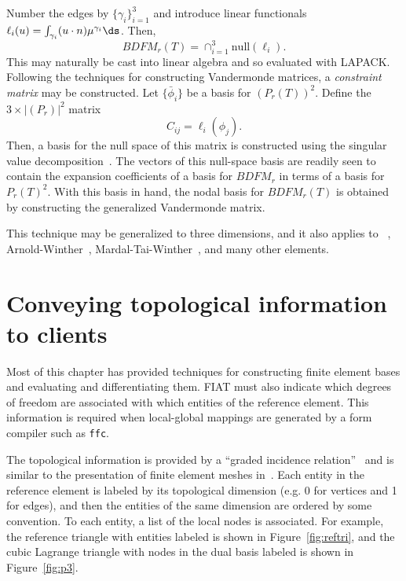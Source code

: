 Number the edges by \( \{ \gamma_i \}_{i=1}^3 \) and introduce linear
functionals \\ \( \ell_i(u) = \int_{\gamma_i} (u \cdot n) \mu^{\gamma_i}
\ds \).  Then,
\[
BDFM_r(T) = \cap_{i=1}^3 \mathrm{null}(\ell_i).
\]
This may naturally be cast into linear algebra and so evaluated with
LAPACK.  Following the techniques for constructing Vandermonde matrices,
a \emph{constraint matrix} may be constructed.  Let \( \{ \bar{\phi}_i \}
\) be a basis for \( (P_r(T))^2 \).  Define the \( 3 \times |(P_r)|^2
\) matrix
\[
C_{ij} = \ell_i( \phi_j ).
\]
Then, a basis for the null space of this matrix is constructed using
the singular value decomposition~\citep{GolubVan1996}.  The vectors of this
null-space basis are readily seen to contain the expansion coefficients
of a basis for \( BDFM_r \) in terms of a basis for \( P_r(T)^2 \).
With this basis in hand, the nodal basis for \( BDFM_r(T) \) is obtained
by constructing the generalized Vandermonde matrix.

This technique may be generalized to three dimensions,
and it also applies to \nedelec{}~\citep{Nedelec1980},
Arnold-Winther~\citep{ArnoldWinther2002},
Mardal-Tai-Winther~\citep{MardalTaiWinther2002}, and many other elements.


\section{Conveying topological information to clients}

Most of this chapter has provided techniques for constructing finite
element bases and evaluating and differentiating them.  FIAT must also
indicate which degrees of freedom are associated with which entities of
the reference element.  This information is required when local-global
mappings are generated by a form compiler such as \texttt{ffc}.

The topological information is provided by a ``graded incidence
relation''~\citep{Kirby2006a,KnepleyKarpeev2009} and is similar to the
presentation of finite element meshes in~\citet{Logg2009}.  Each entity in
the reference element is labeled by its topological dimension (e.g. 0 for
vertices and 1 for edges), and then the entities of the same dimension
are ordered by some convention.  To each entity, a list of the local nodes
is associated.  For example, the reference triangle with entities labeled
is shown in Figure~\ref{fig:reftri}, and the cubic Lagrange triangle
with nodes in the dual basis labeled is shown in Figure~\ref{fig:p3}.

